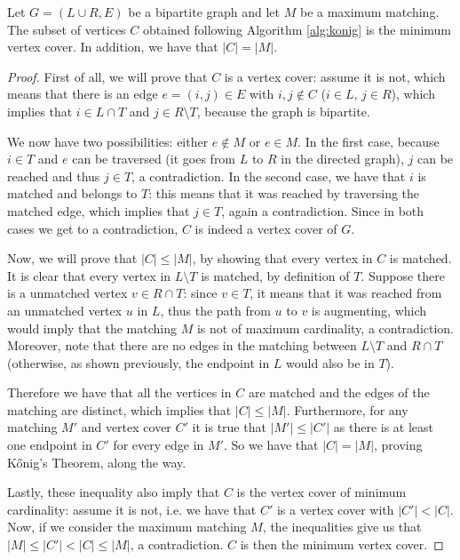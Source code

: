 \begin{lemma}
	Let $G=(L\cup R,E)$ be a bipartite graph and let $M$ be a maximum matching. The subset of vertices $C$ obtained following Algorithm \ref{alg:konig} is the minimum vertex cover. In addition, we have that $|C| = |M|$.
\end{lemma}
\begin{proof}
First of all, we will prove that $C$ is a vertex cover: assume it is not, which means that there is an edge $e = (i,j) \in E$ with $i,j \notin C$ ($i \in L$, $j \in R$), which implies that $i \in L \cap T$ and $j \in R \setminus T$, because the graph is bipartite. 
	
We now have two possibilities: either $e \notin M$ or $e \in M$.  In the first case, because $i \in T$ and $e$ can be traversed (it goes from $L$ to $R$ in the directed graph), $j$ can be reached and thus $j \in T$, a contradiction. In the second case, we have that $i$ is matched and belongs to $T$: this means that it was reached by traversing the matched edge, which implies that $j \in T$, again a contradiction. Since in both cases we get to a contradiction, $C$ is indeed a vertex cover of $G$.

Now, we will prove that $|C| \leq |M|$, by showing that every vertex in $C$ is matched. It is clear that every vertex in $L \setminus T$ is matched, by definition of $T$. Suppose there is a unmatched vertex $v \in R \cap T$: since $v \in T$, it means that it was reached from an unmatched vertex $u$ in $L$, thus the path from $u$ to $v$ is augmenting, which would imply that the matching $M$ is not of maximum cardinality, a contradiction. Moreover, note that there are no edges in the matching between $L \setminus T$ and $R \cap T$ (otherwise, as shown previously, the endpoint in $L$ would also be in $T$).

Therefore we have that all the vertices in $C$ are matched and the edges of the matching are distinct, which implies that $|C| \leq |M|$. Furthermore, for any matching $M'$ and vertex cover $C'$ it is true that $|M'| \leq |C'|$ as there is at least one endpoint in $C'$ for every edge in $M'$. So we have that $|C| = |M|$, proving K\H{o}nig's Theorem, along the way.

Lastly, these inequality also imply that $C$ is the vertex cover of minimum cardinality: assume it is not, i.e. we have that $C'$ is a vertex cover with $|C'| < |C|$. Now, if we consider the maximum matching $M$, the inequalities give us that $|M| \leq |C'| < |C| \leq |M|$, a contradiction. $C$ is then the minimum vertex cover.

\end{proof}

